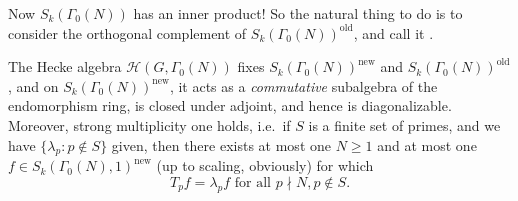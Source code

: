 \documentclass[a4paper]{article}
\begin{document}
Now $S_k(\Gamma_0(N))$ has an inner product! So the natural thing to do is to consider the orthogonal complement of $S_k(\Gamma_0(N))^{\mathrm{old}}$, and call it .

\begin{thm}
  The Hecke algebra $\mathcal{H}(G, \Gamma_0(N))$ fixes $S_k(\Gamma_0(N))^{\mathrm{new}}$ and $S_k(\Gamma_0(N))^{\mathrm{old}}$, and on $S_k(\Gamma_0(N))^{\mathrm{new}}$, it acts as a \emph{commutative} subalgebra of the endomorphism ring, is closed under adjoint, and hence is diagonalizable. Moreover, strong multiplicity one holds, i.e.\ if $S$ is a finite set of primes, and we have $\{\lambda_p: p \not\in S\}$ given, then there exists at most one $N \geq 1$ and at most one $f \in S_k(\Gamma_0(N), 1)^{\mathrm{new}}$ (up to scaling, obviously) for which
  \[
    T_p f = \lambda_p f\text{ for all }p \nmid N, p \not \in S.
  \]
\end{thm}



\printindex
\end{document}
